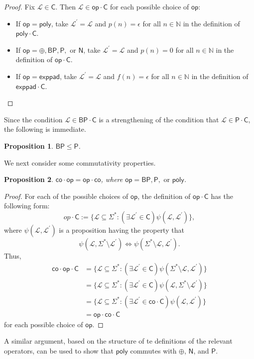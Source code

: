 \documentclass[12pt]{amsart}
\newtheorem*{proposition}{Proposition}
\theoremstyle{definition}
\theoremstyle{remark}
\newcommand{\N}{\mathbb{N}}
\newcommand{\cL}{\mathcal{L}}
\newcommand{\sC}{\mathsf{C}}
\newcommand{\co}{\mathsf{co}}
\newcommand{\sP}{\mathsf{P}}
\newcommand{\poly}{\mathsf{poly}}
\newcommand{\msf}[1]{\mathsf{#1}}
\newcommand{\op}{\msf{op}}
\newcommand{\sN}{\msf{N}}
\newcommand{\BP}{\msf{BP}}
\newcommand{\exppad}{\msf{exppad}}
\begin{document}
\begin{proof}
Fix $\cL\in\sC$. Then $\cL\in\op\cdot\sC$ for each possible choice of $\op$:
\begin{itemize}
\item If $\op=\poly$, take $\cL^\prime=\cL$ and $p(n)=\epsilon$ for all $n\in\N$
  in the definition of $\poly\cdot\sC$.
\item If $\op=\oplus,\BP,\sP,\text{ or }\sN$, take $\cL^\prime=\cL$ and
  $p(n)=0$ for all $n\in\N$ in the definition of $\op\cdot\sC$.
\item If $\op=\exppad$, take $\cL^\prime=\cL$ and $f(n)=\epsilon$ for all
  $n\in\N$ in the definition of $\exppad\cdot\sC$.
\end{itemize}
\end{proof}
Since the condition $\cL\in\BP\cdot\sC$ is a strengthening of the condition that
$\cL\in\sP\cdot\sC$, the following is immediate.
\begin{proposition}
$\BP\leq\sP$.
\end{proposition}

We next consider some commutativity properties.

\begin{proposition}
$\co\cdot\op=\op\cdot\co$, where $\op=\BP,\sP,\text{ or }\poly$.
\end{proposition}

\begin{proof}
For each of the possible choices of $\op$, the definition of $\op\cdot\sC$ has
the following form:
\[
op\cdot\sC:=\{\cL\subseteq\Sigma^*:(\exists\cL^\prime\in\sC)
\psi(\cL,\cL^\prime)\},
\]
where $\psi(\cL,\cL^\prime)$ is a proposition having the property that
\[
\psi(\cL,\Sigma^*\setminus\cL^\prime)\Longleftrightarrow
\psi(\Sigma^*\setminus\cL,\cL^\prime).
\]
Thus,
\begin{align*}
\co\cdot\op\cdot\sC
&=\{\cL\subseteq\Sigma^*:(\exists\cL^\prime\in\sC)\psi(\Sigma^*\setminus\cL,\cL^\prime)\} \\
&=\{\cL\subseteq\Sigma^*:(\exists\cL^\prime\in\sC)
\psi(\cL,\Sigma^*\setminus\cL^\prime)\} \\
&=\{\cL\subseteq\Sigma^*:(\exists\cL^\prime\in\co\cdot\sC)
\psi(\cL,\cL^\prime)\} \\
&=\op\cdot\co\cdot\sC
\end{align*}
for each possible choice of $\op$.
\end{proof}
A similar argument, based on the structure of te definitions of the relevant
operators, can be used to show that $\poly$ commutes with $\oplus$, $\sN$, and
$\sP$.
\end{document}
